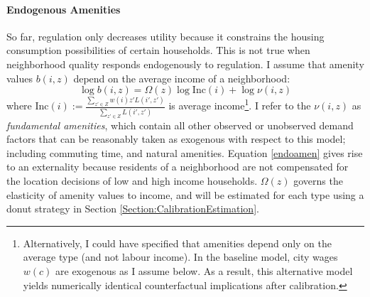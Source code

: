 \documentclass[12pt]{article}
\begin{document}
	\paragraph*{Endogenous Amenities} So far, regulation only decreases utility because it constrains the housing consumption possibilities of certain households. This is not true when neighborhood quality responds endogenously to regulation. I assume that amenity values $b(i, z)$ depend on the average income of a neighborhood:
	\begin{equation}\label{endoamen}
		\log b(i, z) = \Omega(z)\log\text{Inc}(i) + \log \nu(i, z)
	\end{equation}
	 where $\text{Inc}(i) := \frac{\sum_{z' \in Z}w(i)z'L(i', z')}{\sum_{z' \in Z}L(i', z')}$ is average income\footnote{Alternatively, I could have specified that amenities depend only on the average type (and not labour income). In the baseline model, city wages $w(c)$ are exogenous as I assume below. As a result, this alternative model yields numerically identical counterfactual implications after calibration.}. I refer to the $\nu(i, z)$ as \textit{fundamental amenities}, which contain all other observed or unobserved demand factors that can be reasonably taken as exogenous with respect to this model; including commuting time, and natural amenities. Equation \eqref{endoamen} gives rise to an externality because residents of a neighborhood are not compensated for the location decisions of low and high income households. $\Omega(z)$ governs the elasticity of amenity values to income, and will be estimated for each type using a donut strategy in Section \ref{Section:CalibrationEstimation}. 
\end{document}
